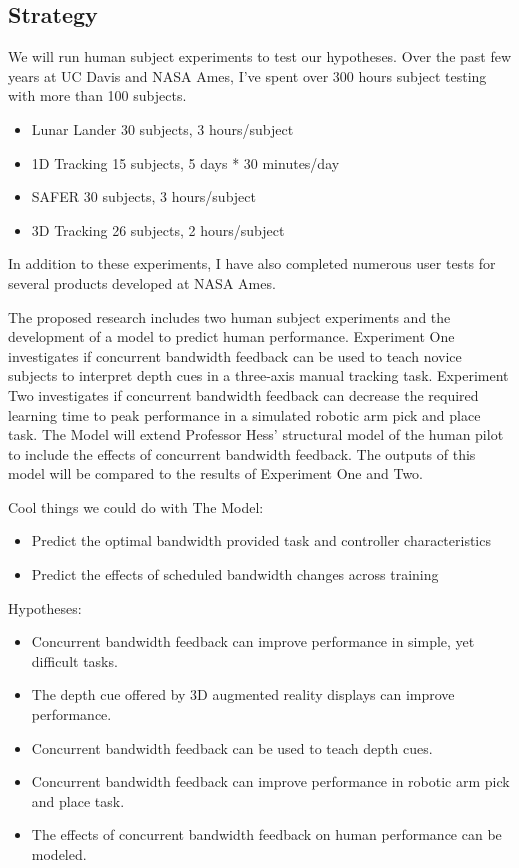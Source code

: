 \documentclass{paper}
\begin{document}
\subsection{Strategy}
We will run human subject experiments to test our hypotheses. Over the past few years at UC Davis and NASA Ames, I’ve spent over 300 hours subject testing with more than 100 subjects.

\begin{itemize}
\item Lunar Lander      30 subjects, 3 hours/subject
\item 1D Tracking       15 subjects, 5 days * 30 minutes/day
\item SAFER        		30 subjects, 3 hours/subject
\item 3D Tracking       26 subjects, 2 hours/subject
\end{itemize}

In addition to these experiments, I have also completed numerous user tests for several products developed at NASA Ames.

The proposed research includes two human subject experiments and the development of a model to predict human performance. Experiment One investigates if concurrent bandwidth feedback can be used to teach novice subjects to interpret depth cues in a three-axis manual tracking task. Experiment Two investigates if concurrent bandwidth feedback can decrease the required learning time to peak performance in a simulated robotic arm pick and place task. The Model will extend Professor Hess’ structural model of the human pilot to include the effects of concurrent bandwidth feedback. The outputs of this model will be compared to the results of Experiment One and Two.

Cool things we could do with The Model:
\begin{itemize}
\item Predict the optimal bandwidth provided task and controller characteristics
\item Predict the effects of scheduled bandwidth changes across training
\end{itemize}

Hypotheses:
\begin{itemize}
\item Concurrent bandwidth feedback can improve performance in simple, yet difficult tasks.
\item The depth cue offered by 3D augmented reality displays can improve performance.
\item Concurrent bandwidth feedback can be used to teach depth cues.
\item Concurrent bandwidth feedback can improve performance in robotic arm pick and place task.
\item The effects of concurrent bandwidth feedback on human performance can be modeled.
\end{itemize}
\end{document}
